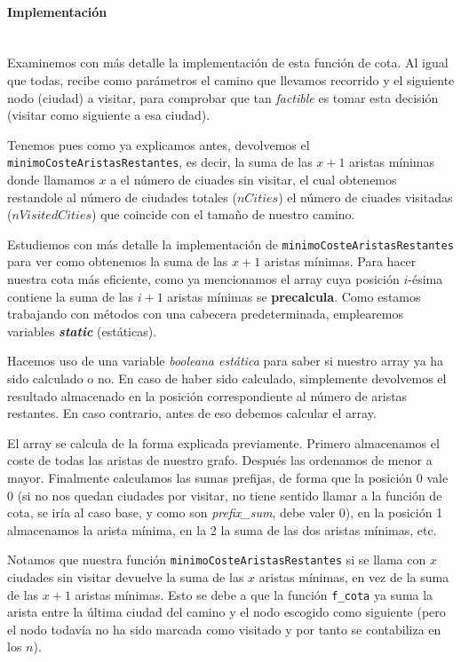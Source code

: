 \documentclass{article}
\newcommand{\myparagraph}[1]{\paragraph{#1}\mbox{}\\}
\begin{document}
\myparagraph{Implementación}

Examinemos con más detalle la implementación de esta función de cota. 
Al igual que todas, recibe como parámetros el camino que llevamos recorrido y el siguiente nodo (ciudad) a visitar, para comprobar que tan \textit{factible} es tomar esta decisión (visitar como siguiente a esa ciudad).



Tenemos pues como ya explicamos antes, devolvemos el \verb|minimoCosteAristasRestantes|, es decir, la suma de las $x+1$ aristas mínimas donde llamamos $x$ a el número de ciuades sin visitar, el cual obtenemos restandole al número de ciudades totales ($nCities$) el número de ciuades visitadas ($nVisitedCities$) que coincide con el tamaño de nuestro camino.



Estudiemos con más detalle la implementación de \verb|minimoCosteAristasRestantes| para ver como obtenemos la suma de las $x+1$ aristas mínimas. Para hacer nuestra cota más eficiente, como ya mencionamos el array cuya posición $i$-ésima contiene la suma de las $i+1$ aristas mínimas se \textbf{precalcula}. Como estamos trabajando con métodos con una cabecera predeterminada, emplearemos variables \textit{\textbf{static}} (estáticas). 

Hacemos uso de una variable \textit{booleana estática} para saber si nuestro array ya ha sido calculado o no. En caso de haber sido calculado, simplemente devolvemos el resultado almacenado en la posición correspondiente al número de aristas restantes. En caso contrario, antes de eso debemos calcular el array.

El array se calcula de la forma explicada previamente. Primero almacenamos el coste de todas las aristas de nuestro grafo. Después las ordenamos de menor a mayor. Finalmente calculamos las sumas prefijas, de forma que la posición 0 vale 0 (si no nos quedan ciudades por visitar, no tiene sentido llamar a la función de cota, se iría al caso base, y como son \textit{prefix\_sum}, debe valer 0), en la posición 1 almacenamos la arista mínima, en la 2 la suma de las dos aristas mínimas, etc.

Notamos que nuestra función \verb|minimoCosteAristasRestantes| si se llama con $x$ ciudades sin visitar devuelve la suma de las $x$ aristas mínimas, en vez de la suma de las $x + 1$ aristas mínimas. Esto se debe a que la función \verb|f_cota| ya suma la arista entre la última ciudad del camino y el nodo escogido como siguiente (pero el nodo todavía no ha sido marcada como visitado y por tanto se contabiliza en los $n$).
\end{document}
